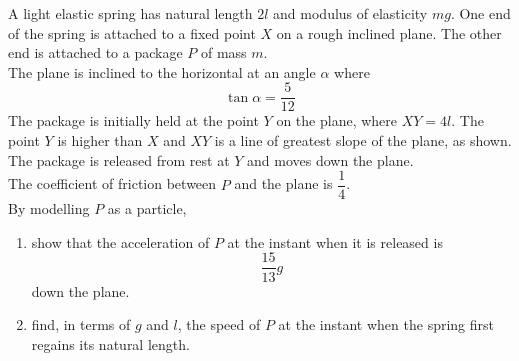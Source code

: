 \documentclass[leqno]{article}
\begin{document}
\begin{enumerate}[
  label=\textbf{\arabic*.},
  leftmargin=*,
  topsep=0pt,
  partopsep=0pt,
  parsep=0pt
]
\begin{figure}[H]
\end{figure}


A light elastic spring has natural length $2l$ and modulus of elasticity $mg$. One end of the spring is attached to a fixed point $X$ on a rough inclined plane. The other end is attached to a package $P$ of mass $m$. \\

The plane is inclined to the horizontal at an angle $\alpha$ where
\[
\tan \alpha = \dfrac{5}{12}
\] 
The package is initially held at the point $Y$ on the plane, where $XY = 4l$. The point $Y$ is higher than $X$ and $XY$ is a line of greatest slope of the plane, as shown. The package is released from rest at $Y$ and moves down the plane. \\

The coefficient of friction between $P$ and the plane is $\dfrac{1}{4}$. \\

By modelling $P$ as a particle, \\
\begin{enumerate}[label=\textbf{(\alph*)}]
  \item show that the acceleration of $P$ at the instant when it is released is
  \[
  \dfrac{15}{13}g
  \]
  down the plane.  \\
  \item find, in terms of $g$ and $l$, the speed of $P$ at the instant when the spring first regains its natural length.  
\end{enumerate}


\end{enumerate}
\end{document}
